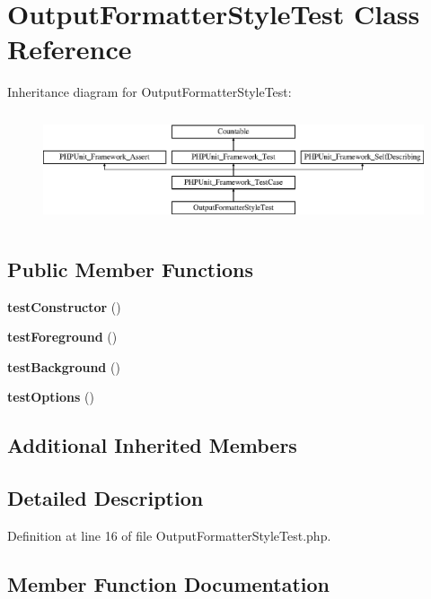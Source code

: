 \section{Output\+Formatter\+Style\+Test Class Reference}
\label{class_symfony_1_1_component_1_1_console_1_1_tests_1_1_formatter_1_1_output_formatter_style_test}
Inheritance diagram for Output\+Formatter\+Style\+Test\+:\begin{figure}[H]
\begin{center}
\leavevmode
\includegraphics[height=3.303835cm]{class_symfony_1_1_component_1_1_console_1_1_tests_1_1_formatter_1_1_output_formatter_style_test}
\end{center}
\end{figure}
\subsection*{Public Member Functions}
\begin{DoxyCompactItemize}
\item 
{\bf test\+Constructor} ()
\item 
{\bf test\+Foreground} ()
\item 
{\bf test\+Background} ()
\item 
{\bf test\+Options} ()
\end{DoxyCompactItemize}
\subsection*{Additional Inherited Members}


\subsection{Detailed Description}


Definition at line 16 of file Output\+Formatter\+Style\+Test.\+php.



\subsection{Member Function Documentation}
